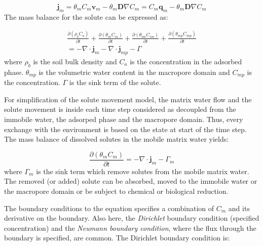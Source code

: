 \documentclass{report}
\begin{document}
\begin{equation}
\mathbf{j}_{m}=\theta_{m} C_{m}\mathbf{v}_{m}
-\theta_{m}\mathbf{D}\nabla C_{m}=C_{m}
\mathbf{q}_{m}-\theta_{m}\mathbf{D}\nabla C_{m}
\label{eq:soltransport}
\end{equation}
%
The mass balance for the solute
can be expressed as:


\begin{eqnarray}
\frac{\partial (\rho_b C_a)}{\partial t} + \frac{\partial
(\theta_{m}
  C_{m})}{\partial t} + \frac{\partial (\theta_{im}
  C_{im})}{\partial t} + \frac{\partial (\theta_{mp}
  C_{mp})}{\partial t} \nonumber \\ =-\nabla \cdot \mathbf{j}_{m}-\nabla
  \cdot \mathbf{j}_{mp} - \Gamma
\label{eq:solmassbal_tot}
\end{eqnarray}
%
where $\rho_b$ is the soil bulk density and $C_a$ is the
concentration in the adsorbed phase. $\theta_{mp}$
is the volumetric water content in the macropore domain and $C_{mp}$
is the concentration. $\Gamma$ is the sink term of the solute.

For simplification of the solute movement model, the matrix water
flow and the solute movement is inside each time step considered as
decoupled from the immobile water, the adsorped phase and the
macropore domain. Thus, every exchange with the environment is based
on the state at start of the time step. The mass balance of
dissolved solutes in the mobile matrix water yields:

\begin{equation}
\frac{\partial (\theta_{m} C_{m})} {\partial t}
   =-\nabla \cdot \mathbf{j}_{m} - \Gamma_{m}
\label{eq:solmassbal_im}
\end{equation}
%
where $\Gamma_{m}$ is the sink term which remove solutes from the
mobile matrix water. The removed (or added) solute can be absorbed,
moved to the immobile water or the macropore domain or be subject to
chemical or biological reduction.

The boundary conditions to the equation specifies a combination of
$C_{m}$ and its derivative on the boundary. Also here, the
\textit{Dirichlet} boundary condition (specified
concentration) and the \textit{Neumann boundary
  condition}, where the flux through the boundary is
specified, are common. The Dirichlet boundary condition is:
\end{document}
